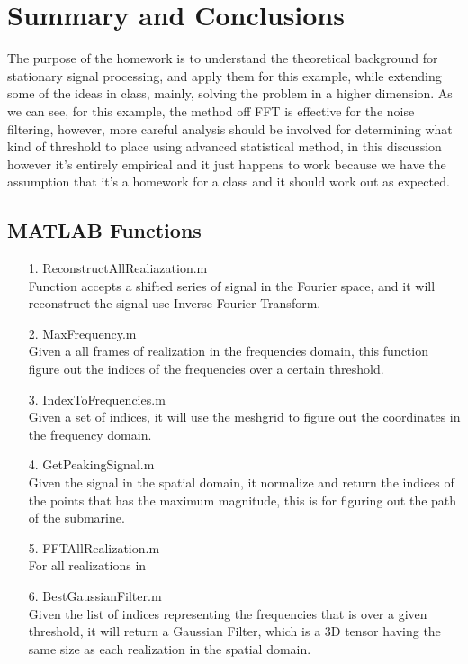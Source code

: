 \documentclass{article}
\begin{document}
\newpage
\section{Summary and Conclusions}
    \hspace{1.1em}
    The purpose of the homework is to understand the theoretical background for stationary signal processing, and apply them for this example, while extending some of the ideas in class, mainly, solving the problem in a higher dimension. As we can see, for this example, the method off FFT is effective for the noise filtering, however, more careful analysis should be involved for determining what kind of threshold to place using advanced statistical method, in this discussion however it's entirely empirical and it just happens to work because we have the assumption that it's a homework for a class and it should work out as expected. 

\printbibliography

\begin{appendices}

\section{MATLAB Functions}
    \begin{enumerate}
        \item[1.] ReconstructAllRealiazation.m \\
        Function accepts a shifted series of signal in the Fourier space, and it will reconstruct the signal use Inverse Fourier Transform.  
        \item[2.] MaxFrequency.m \\
        Given a all frames of realization in the frequencies domain, this function figure out the indices of the frequencies over a certain threshold. 
        \item[3.] IndexToFrequencies.m \\
        Given a set of indices, it will use the meshgrid to figure out the coordinates in the frequency domain. 
        \item[4.] GetPeakingSignal.m \\
        Given the signal in the spatial domain, it normalize and return the indices of the points that has the maximum magnitude, this is for figuring out the path of the submarine. 
        \item[5.] FFTAllRealization.m \\
        For all realizations in 
        \item[6.] BestGaussianFilter.m \\
        Given the list of indices representing the frequencies that is over a given threshold, it will return a Gaussian Filter, which is a 3D tensor having the same size as each realization in the spatial domain. 
    \end{enumerate}


    
\end{appendices}
\end{document}
